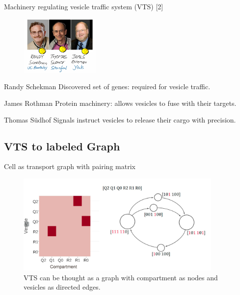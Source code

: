 \documentclass{beamer}
\begin{document}
  
    \begin{frame}[label=simmonshall]{Machinery regulating vesicle traffic system (VTS) [2]}
    \begin{figure}
\includegraphics[width=0.35\textwidth]{22.png} 
\label{some example}
\end{figure}

      \begin{block}{Randy Schekman}
        Discovered set of \alert{genes}: required for vesicle traffic.
      \end{block}
      \begin{exampleblock}{James Rothman}
       \alert{Protein machinery}: allows vesicles to fuse with their
targets.
      \end{exampleblock}
      \begin{alertblock}{Thomas Südhof}
        \alert{Signals} instruct vesicles to release their cargo with precision.
      \end{alertblock}
    \end{frame}
 
  
  \subsection{VTS to labeled Graph}
  
  \begin{frame}[label=figs1]{Cell as transport graph with pairing matrix}
    \begin{figure}
\includegraphics[width=0.90\textwidth]{3.jpg} 
\caption{VTS can be thought as a graph with compartment as nodes and vesicles as directed edges.}
\label{some}
\end{figure}
        \end{frame}
  
\end{document}
